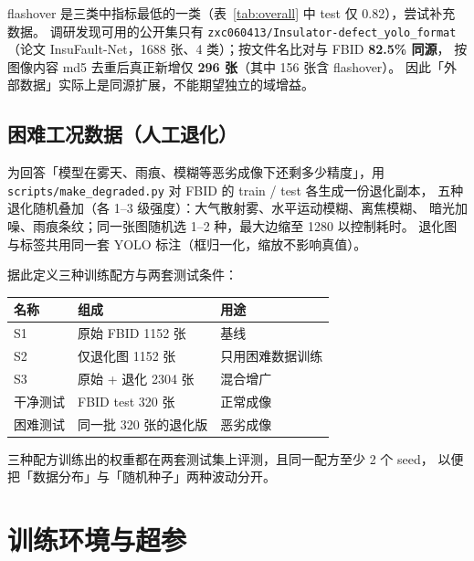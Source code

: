 \documentclass[UTF8,a4paper,11pt]{ctexart}
\begin{document}
flashover 是三类中指标最低的一类（表~\ref{tab:overall} 中 test 仅 0.82），尝试补充数据。
调研发现可用的公开集只有 \texttt{zxc060413/Insulator-defect\_yolo\_format}
（论文 InsuFault-Net，1688 张、4 类）；按文件名比对与 FBID \textbf{82.5\% 同源}，
按图像内容 md5 去重后真正新增仅 \textbf{296 张}（其中 156 张含 flashover）。
因此「外部数据」实际上是同源扩展，不能期望独立的域增益。

\subsection{困难工况数据（人工退化）}

为回答「模型在雾天、雨痕、模糊等恶劣成像下还剩多少精度」，用
\texttt{scripts/make\_degraded.py} 对 FBID 的 train / test 各生成一份退化副本，
五种退化随机叠加（各 1--3 级强度）：大气散射雾、水平运动模糊、离焦模糊、
暗光加噪、雨痕条纹；同一张图随机选 1--2 种，最大边缩至 1280 以控制耗时。
退化图与标签共用同一套 YOLO 标注（框归一化，缩放不影响真值）。

据此定义三种训练配方与两套测试条件：

\begin{center}
\begin{tabular}{lll}
\toprule
名称 & 组成 & 用途 \\
\midrule
S1 & 原始 FBID 1152 张 & 基线 \\
S2 & 仅退化图 1152 张 & 只用困难数据训练 \\
S3 & 原始 + 退化 2304 张 & 混合增广 \\
\midrule
干净测试 & FBID test 320 张 & 正常成像 \\
困难测试 & 同一批 320 张的退化版 & 恶劣成像 \\
\bottomrule
\end{tabular}
\end{center}

三种配方训练出的权重都在两套测试集上评测，且同一配方至少 2 个 seed，
以便把「数据分布」与「随机种子」两种波动分开。

\section{训练环境与超参}
\end{document}
